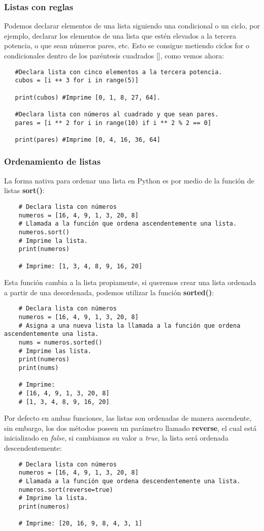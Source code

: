 \subsubsection{Listas con reglas}
\hspace{0.55cm}Podemos declarar elementos de una lista siguiendo una condicional o un ciclo, por ejemplo, declarar los elementos de una lista que estén elevados a la tercera potencia, o que sean números pares, etc. Esto se consigue metiendo ciclos for o condicionales dentro de los paréntesis cuadrados [], como vemos ahora:
\begin{lstlisting}
   #Declara lista con cinco elementos a la tercera potencia.
   cubos = [i ++ 3 for i in range(5)]
   
   print(cubos) #Imprime [0, 1, 8, 27, 64].
   
   #Declara lista con números al cuadrado y que sean pares.
   pares = [i ** 2 for i in range(10) if i ** 2 % 2 == 0]
   
   print(pares) #Imprime [0, 4, 16, 36, 64]
\end{lstlisting}


\subsubsection{Ordenamiento de listas}
\hspace{0.55cm}La forma nativa para ordenar una lista en Python es por medio de la función de listas \textbf{sort()}:
\begin{lstlisting}
	# Declara lista con números
	numeros = [16, 4, 9, 1, 3, 20, 8]
	# Llamada a la función que ordena ascendentemente una lista.
	numeros.sort()
	# Imprime la lista.
	print(numeros)
	
	# Imprime: [1, 3, 4, 8, 9, 16, 20]
\end{lstlisting}

Esta función cambia a la lista propiamente, si queremos crear una lista ordenada a partir de una desordenada, podemos utilizar la función \textbf{sorted()}:
\begin{lstlisting}
	# Declara lista con números
	numeros = [16, 4, 9, 1, 3, 20, 8]
	# Asigna a una nueva lista la llamada a la función que ordena ascendentemente una lista.
	nums = numeros.sorted()
	# Imprime las lista.
	print(numeros)
	print(nums)
	
	# Imprime:
	# [16, 4, 9, 1, 3, 20, 8]
	# [1, 3, 4, 8, 9, 16, 20]
\end{lstlisting}

Por defecto en ambas funciones, las listas son ordenadas de manera ascendente, sin embargo, los dos métodos poseen un parámetro llamado \textbf{reverse}, el cual está inicializado en \textit{false}, si cambiamos su valor a \textit{true}, la lista será ordenada descendentemente:
\begin{lstlisting}
	# Declara lista con números
	numeros = [16, 4, 9, 1, 3, 20, 8]
	# Llamada a la función que ordena descendentemente una lista.
	numeros.sort(reverse=true)
	# Imprime la lista.
	print(numeros)
	
	# Imprime: [20, 16, 9, 8, 4, 3, 1]
\end{lstlisting}

